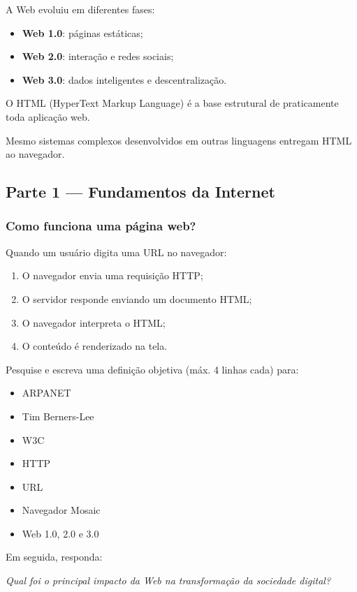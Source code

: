 \documentclass[12pt,a4paper]{article}
\begin{document}
A Web evoluiu em diferentes fases:

\begin{itemize}
\item \textbf{Web 1.0}: páginas estáticas;
\item \textbf{Web 2.0}: interação e redes sociais;
\item \textbf{Web 3.0}: dados inteligentes e descentralização.
\end{itemize}

O HTML (HyperText Markup Language) é a base estrutural de praticamente toda aplicação web.

Mesmo sistemas complexos desenvolvidos em outras linguagens entregam HTML ao navegador.


\subsection{Parte 1 — Fundamentos da Internet}

\subsubsection{Como funciona uma página web?}

Quando um usuário digita uma URL no navegador:

\begin{enumerate}
\item O navegador envia uma requisição HTTP;
\item O servidor responde enviando um documento HTML;
\item O navegador interpreta o HTML;
\item O conteúdo é renderizado na tela.
\end{enumerate}


\begin{boxAtividade}

Pesquise e escreva uma definição objetiva (máx. 4 linhas cada) para:

\begin{itemize}
\item ARPANET
\item Tim Berners-Lee
\item W3C
\item HTTP
\item URL
\item Navegador Mosaic
\item Web 1.0, 2.0 e 3.0
\end{itemize}

Em seguida, responda:

\textit{Qual foi o principal impacto da Web na transformação da sociedade digital?}

\end{boxAtividade}
\end{document}
